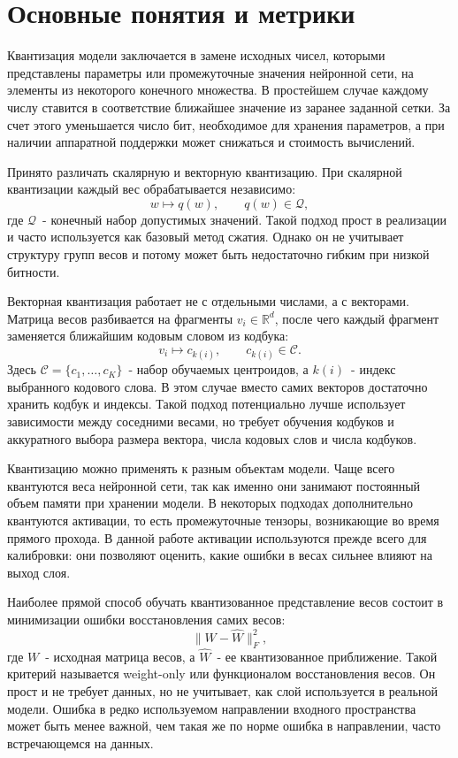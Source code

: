 \documentclass[a4paper,12pt]{article}
\begin{document}
\section{Основные понятия и метрики}

Квантизация модели заключается в замене исходных чисел, которыми представлены параметры или промежуточные значения нейронной сети, на элементы из некоторого конечного множества. В простейшем случае каждому числу ставится в соответствие ближайшее значение из заранее заданной сетки. За счет этого уменьшается число бит, необходимое для хранения параметров, а при наличии аппаратной поддержки может снижаться и стоимость вычислений.

Принято различать скалярную и векторную квантизацию. При скалярной квантизации каждый вес обрабатывается независимо:
\[
    w \mapsto q(w), \qquad q(w) \in \mathcal{Q},
\]
где $\mathcal{Q}$~- конечный набор допустимых значений. Такой подход прост в реализации и часто используется как базовый метод сжатия. Однако он не учитывает структуру групп весов и потому может быть недостаточно гибким при низкой битности.

Векторная квантизация работает не с отдельными числами, а с векторами. Матрица весов разбивается на фрагменты $v_i \in \mathbb{R}^d$, после чего каждый фрагмент заменяется ближайшим кодовым словом из кодбука:
\[
    v_i \mapsto c_{k(i)}, \qquad c_{k(i)} \in \mathcal{C}.
\]
Здесь $\mathcal{C} = \{c_1, \ldots, c_K\}$~- набор обучаемых центроидов, а $k(i)$~- индекс выбранного кодового слова. В этом случае вместо самих векторов достаточно хранить кодбук и индексы. Такой подход потенциально лучше использует зависимости между соседними весами, но требует обучения кодбуков и аккуратного выбора размера вектора, числа кодовых слов и числа кодбуков.

Квантизацию можно применять к разным объектам модели. Чаще всего квантуются веса нейронной сети, так как именно они занимают постоянный объем памяти при хранении модели. В некоторых подходах дополнительно квантуются активации, то есть промежуточные тензоры, возникающие во время прямого прохода. В данной работе активации используются прежде всего для калибровки: они позволяют оценить, какие ошибки в весах сильнее влияют на выход слоя.

Наиболее прямой способ обучать квантизованное представление весов состоит в минимизации ошибки восстановления самих весов:
\[
    \|W - \widehat{W}\|_F^2,
\]
где $W$~- исходная матрица весов, а $\widehat{W}$~- ее квантизованное приближение. Такой критерий называется weight-only или функционалом восстановления весов. Он прост и не требует данных, но не учитывает, как слой используется в реальной модели. Ошибка в редко используемом направлении входного пространства может быть менее важной, чем такая же по норме ошибка в направлении, часто встречающемся на данных.
\end{document}
